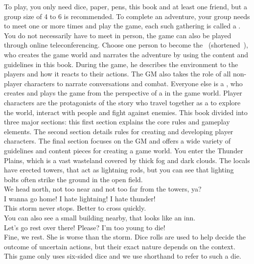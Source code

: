 To play, you only need dice, paper, pens, this book and at least one friend, but a group size of 4 to 6 is recommended.
To complete an adventure, your group needs to meet one or more times and play the game, each such gathering is called a .
You do not necessarily have to meet in person, the game can also be played through online teleconferencing.
%
\ofpar
%
Choose one person to become the ~(shortened~), who creates the game world and narrates the adventure by using the content and guidelines in this book.
During the game, he describes the environment to the players and how it reacts to their actions. 
The GM also takes the role of all non-player characters to narrate conversations and combat. 
Everyone else is a , who creates and plays the game from the perspective of a  in the game world.
Player characters are the protagonists of the story who travel together as a  to explore the world, interact with people and fight against enemies. 
This book divided into three major sections: this first section explains the core rules and gameplay elements.
The second section details rules for creating and developing player characters.
The final section focuses on the GM and offers a wide variety of guidelines and content pieces for creating a game world. 
%
\vfill
%
{
	\newcommand{\nl}{\vspace{0.2cm}\\}
	 You enter the Thunder Plains, which is a vast wasteland covered by thick fog and dark clouds.
	The locals have erected towers, that act as lightning rods, but you can see that lighting bolts often strike the ground in the open field.\nl
	 We head north, not too near and not too far from the towers, ya?\nl
	 I wanna go home! I hate lightning! I hate thunder!\nl
	 This storm never stops. Better to cross quickly.\nl
	 You can also see a small building nearby, that looks like an inn.\nl
	 Let’s go rest over there! Please? I'm too young to die!\nl
	 Fine, we rest. She is worse than the storm.
}
%
\vfill
%
Dice rolls are used to help decide the outcome of uncertain actions, but their exact nature depends on the context. 
This game only uses six-sided dice and we use  shorthand to refer to such a die.
